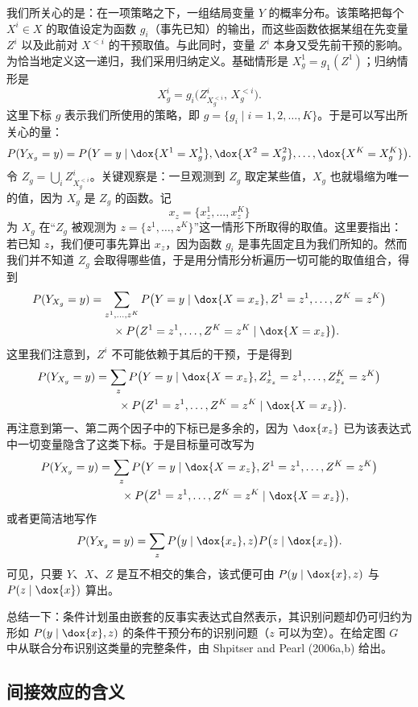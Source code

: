 我们所关心的是：在一项策略之下，一组结局变量 $Y$ 的概率分布。该策略把每个 $X^i\in X$ 的取值设定为函数 $g_i$（事先已知）的输出，而这些函数依据某组在先变量 $Z^i$ 以及此前对 $X^{<i}$ 的干预取值。与此同时，变量 $Z^i$ 本身又受先前干预的影响。为恰当地定义这一递归，我们采用归纳定义。基础情形是 $X^1_g=g_1(Z^1)$；归纳情形是
\[
X^i_g=g_i\bigl(Z^i_{X_g^{<i}},\,X^{<i}_g\bigr).
\]
这里下标 $g$ 表示我们所使用的策略，即 $g=\{g_i\mid i=1,2,\dots,K\}$。于是可以写出所关心的量：
\[
P(Y_{X_g}=y)=P\bigl(Y=y\mid \dox{X^1=X^1_g},\dox{X^2=X^2_g},\dots,\dox{X^K=X^K_g}\bigr).
\]
令 $Z_g=\bigcup_i Z^i_{X_g^{<i}}$。关键观察是：一旦观测到 $Z_g$ 取定某些值，$X_g$ 也就塌缩为唯一的值，因为 $X_g$ 是 $Z_g$ 的函数。记
\[
x_z=\{x^1_z,\dots,x^K_z\}
\]
为 $X_g$ 在“$Z_g$ 被观测为 $z=\{z^1,\dots,z^K\}$”这一情形下所取得的取值。这里要指出：若已知 $z$，我们便可事先算出 $x_z$，因为函数 $g_i$ 是事先固定且为我们所知的。然而我们并不知道 $Z_g$ 会取得哪些值，于是用分情形分析遍历一切可能的取值组合，得到
\begin{align*}
P(Y_{X_g}=y)&=\sum_{z^1,\dots,z^K}P\bigl(Y=y\mid\dox{X=x_z},Z^1=z^1,\dots,Z^K=z^K\bigr)\\
&\qquad\times P\bigl(Z^1=z^1,\dots,Z^K=z^K\mid\dox{X=x_z}\bigr).
\end{align*}
这里我们注意到，$Z^i$ 不可能依赖于其后的干预，于是得到
\begin{align*}
P(Y_{X_g}=y)&=\sum_{z}P\bigl(Y=y\mid\dox{X=x_z},Z^1_{x_z}=z^1,\dots,Z^K_{x_z}=z^K\bigr)\\
&\qquad\times P\bigl(Z^1=z^1,\dots,Z^K=z^K\mid\dox{X=x_z}\bigr).
\end{align*}
再注意到第一、第二两个因子中的下标已是多余的，因为 $\dox{x_z}$ 已为该表达式中一切变量隐含了这类下标。于是目标量可改写为
\begin{align*}
P(Y_{X_g}=y)&=\sum_{z}P\bigl(Y=y\mid\dox{X=x_z},Z^1=z^1,\dots,Z^K=z^K\bigr)\\
&\qquad\times P\bigl(Z^1=z^1,\dots,Z^K=z^K\mid\dox{X=x_z}\bigr),
\end{align*}
或者更简洁地写作
\[
P(Y_{X_g}=y)=\sum_{z}P\bigl(y\mid\dox{x_z},z\bigr)P\bigl(z\mid\dox{x_z}\bigr).
\]
可见，只要 $Y$、$X$、$Z$ 是互不相交的集合，该式便可由 $P(y\mid\dox{x},z)$ 与 $P(z\mid\dox{x})$ 算出。

总结一下：条件计划虽由嵌套的反事实表达式自然表示，其识别问题却仍可归约为形如 $P(y\mid\dox{x},z)$ 的条件干预分布的识别问题（$z$ 可以为空）。在给定图 $G$ 中从联合分布识别这类量的完整条件，由 Shpitser and Pearl (2006a,b) 给出。

\subsection{间接效应的含义}

